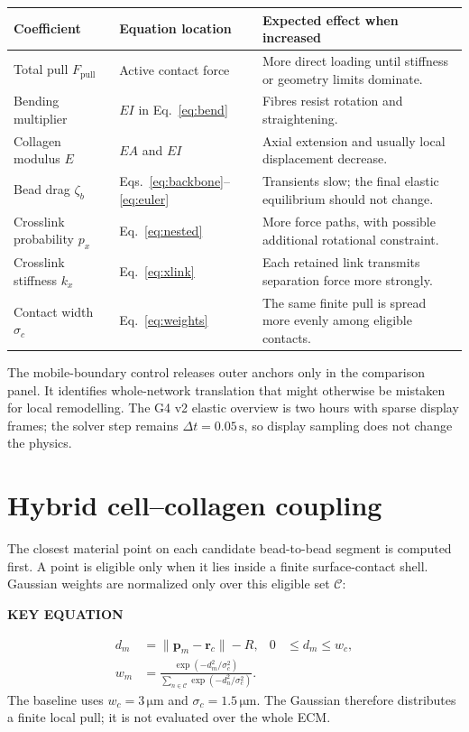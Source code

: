 \documentclass[10.5pt]{article}
\newcommand{\rv}{\mathbf r}
\newcommand{\keylabel}{\par\smallskip\noindent\textcolor{g4}{\textbf{KEY EQUATION}}\par\vspace{-5pt}}
\newcommand{\unit}[1]{\,\mathrm{#1}}
\begin{document}
\begin{longtable}{>{\raggedright\arraybackslash}p{}p{}p{}}
\toprule
Coefficient & Equation location & Expected effect when increased \\
\midrule
Total pull $F_{\mathrm{pull}}$ & Active contact force & More direct loading until stiffness or
geometry limits dominate. \\
Bending multiplier & $EI$ in Eq.~\eqref{eq:bend} & Fibres resist rotation and straightening. \\
Collagen modulus $E$ & $EA$ and $EI$ & Axial extension and usually local displacement decrease. \\
Bead drag $\zeta_b$ & Eqs.~\eqref{eq:backbone}--\eqref{eq:euler} & Transients slow; the final
elastic equilibrium should not change. \\
Crosslink probability $p_x$ & Eq.~\eqref{eq:nested} & More force paths, with possible additional
rotational constraint. \\
Crosslink stiffness $k_x$ & Eq.~\eqref{eq:xlink} & Each retained link transmits separation force
more strongly. \\
Contact width $\sigma_c$ & Eq.~\eqref{eq:weights} & The same finite pull is spread more evenly
among eligible contacts. \\
\bottomrule
\end{longtable}

The mobile-boundary control releases outer anchors only in the comparison panel. It identifies
whole-network translation that might otherwise be mistaken for local remodelling. The G4 v2
elastic overview is two hours with sparse display frames; the solver step remains
$\Delta t=0.05\unit{s}$, so display sampling does not change the physics.

\section{Hybrid cell--collagen coupling}

The closest material point on each candidate bead-to-bead segment is computed first. A point is
eligible only when it lies inside a finite surface-contact shell. Gaussian weights are normalized
only over this eligible set $\mathcal C$:
\keylabel
\begin{align}
 d_m&=\lVert\mathbf p_m-\rv_c\rVert-R,
 &0&\le d_m\le w_c,\\
 w_m&=\frac{\exp(-d_m^2/\sigma_c^2)}
 {\displaystyle\sum_{n\in\mathcal C}\exp(-d_n^2/\sigma_c^2)}.
 \label{eq:weights}
\end{align}
The baseline uses $w_c=3\unit{\mu m}$ and $\sigma_c=1.5\unit{\mu m}$. The Gaussian therefore
distributes a finite local pull; it is not evaluated over the whole ECM.
\end{document}
